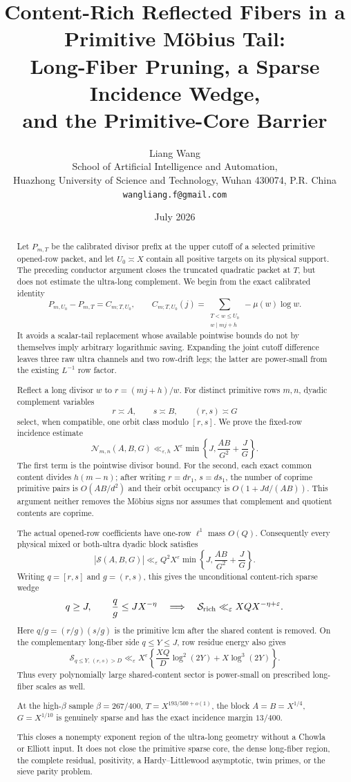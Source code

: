 \documentclass[11pt]{article}
\title{\textbf{Content-Rich Reflected Fibers in a Primitive M\"obius Tail:}\\
\textbf{Long-Fiber Pruning, a Sparse Incidence Wedge,}\\
\textbf{and the Primitive-Core Barrier}}
\author{Liang Wang\\
\small School of Artificial Intelligence and Automation,\\[-0.2em]
\small Huazhong University of Science and Technology, Wuhan 430074, P.R. China\\
\small \texttt{wangliang.f@gmail.com}}
\date{July 2026}
\theoremstyle{definition}
\theoremstyle{remark}
\newcommand{\eps}{\varepsilon}
\newcommand{\cN}{\mathcal N}
\newcommand{\cS}{\mathcal S}
\begin{document}
\maketitle

\begin{abstract}
Let $P_{m,T}$ be the calibrated divisor prefix at the upper cutoff of
a selected primitive opened-row packet, and let $U_0\asymp X$ contain
all positive targets on its physical support.  The preceding
conductor argument closes the truncated quadratic packet at $T$, but
does not estimate the ultra-long complement.  We begin from the exact
calibrated identity
\[
 P_{m,U_0}-P_{m,T}=C_{m;T,U_0},\qquad
 C_{m;T,U_0}(j)=
 \sum_{\substack{T<w\le U_0\\w\mid mj+h}}-\mu(w)\log w.
\]
It avoids a scalar-tail replacement whose available pointwise bounds
do not by themselves imply arbitrary logarithmic saving.  Expanding
the joint cutoff difference leaves three raw ultra channels and two
row-drift legs; the latter are power-small from the existing
$L^{-1}$ row factor.

Reflect a long divisor $w$ to $r=(mj+h)/w$.  For distinct primitive
rows $m,n$, dyadic complement variables
\[
 r\asymp A,\qquad s\asymp B,\qquad (r,s)\asymp G
\]
select, when compatible, one orbit class modulo $[r,s]$.  We prove the
fixed-row incidence estimate
\[
 \cN_{m,n}(A,B,G)
 \ll_{\eps,h}X^\eps
 \min\left\{J,\frac{AB}{G^2}+\frac JG\right\}.
\]
The first term is the pointwise divisor bound.  For the second, each
exact common content divides $h(m-n)$; after writing
$r=dr_1$, $s=ds_1$, the number of coprime primitive pairs is
$O(AB/d^2)$ and their orbit occupancy is
$O(1+Jd/(AB))$.  This argument neither removes the M\"obius signs nor
assumes that complement and quotient contents are coprime.

The actual opened-row coefficients have one-row $\ell^1$ mass
$O(Q)$.  Consequently every physical mixed or both-ultra dyadic block
satisfies
\[
 |\cS(A,B,G)|
 \ll_\eps Q^2X^\eps
 \min\left\{J,\frac{AB}{G^2}+\frac JG\right\}.
\]
Writing $q=[r,s]$ and $g=(r,s)$, this gives the unconditional
content-rich sparse wedge
\[
 q\ge J,\qquad \frac qg\le JX^{-\eta}
 \quad\Longrightarrow\quad
 \cS_{\rm rich}\ll_\eps XQX^{-\eta+\eps}.
\]
Here $q/g=(r/g)(s/g)$ is the primitive lcm after the shared content is
removed.  On the complementary long-fiber side $q\le Y\le J$, row
residue energy also gives
\[
 \cS_{q\le Y,\,(r,s)>D}
 \ll_\eps X^\eps\left\{
 \frac{XQ}{D}\log^2(2Y)+X\log^3(2Y)
 \right\}.
\]
Thus every polynomially large shared-content sector is power-small on
prescribed long-fiber scales as well.

At the high-$\beta$ sample
$\beta=267/400$, $T=X^{193/500+o(1)}$, the block
$A=B=X^{1/4}$, $G=X^{1/10}$ is genuinely sparse and has the exact
incidence margin $13/400$.

This closes a nonempty exponent region of the ultra-long geometry
without a Chowla or Elliott input.  It does not close the primitive sparse core,
the dense long-fiber region, the complete residual, positivity, a
Hardy--Littlewood asymptotic, twin primes, or the sieve parity problem.
\end{abstract}
\end{document}
